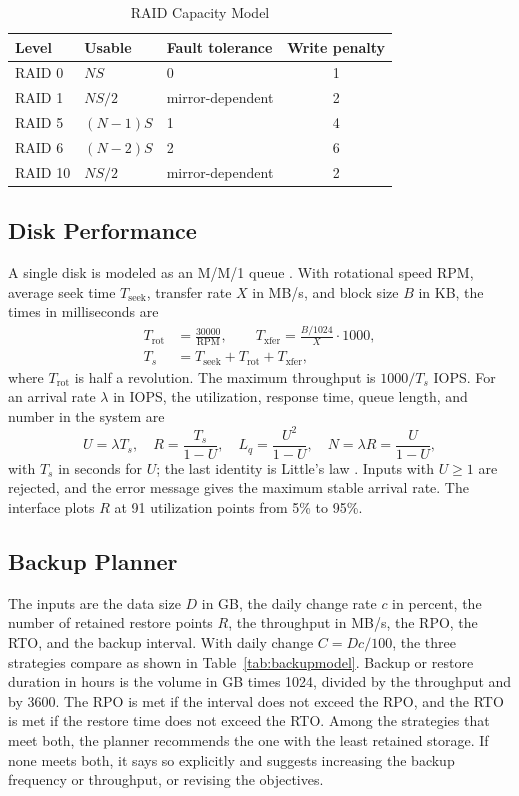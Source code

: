 \documentclass{ieeeaccess}
\begin{document}
\begin{table}[!t]
\caption{RAID Capacity Model}
\label{tab:raidcap}
\centering
\footnotesize
\begin{tabular}{lllc}
\toprule
Level & Usable & Fault tolerance & Write penalty \\
\midrule
RAID 0 & $N S$ & 0 & 1 \\
RAID 1 & $N S/2$ & mirror-dependent & 2 \\
RAID 5 & $(N-1) S$ & 1 & 4 \\
RAID 6 & $(N-2) S$ & 2 & 6 \\
RAID 10 & $N S/2$ & mirror-dependent & 2 \\
\bottomrule
\end{tabular}
\end{table}

\subsection{Disk Performance}
A single disk is modeled as an M/M/1 queue \cite{kleinrock1975queueing}. With rotational speed RPM, average seek time $T_{\text{seek}}$, transfer rate $X$ in MB/s, and block size $B$ in KB, the times in milliseconds are \begin{align} T_{\text{rot}} &= \frac{30000}{\text{RPM}}, \qquad T_{\text{xfer}} = \frac{B/1024}{X} \cdot 1000, \\ T_s &= T_{\text{seek}} + T_{\text{rot}} + T_{\text{xfer}} , \end{align} where $T_{\text{rot}}$ is half a revolution. The maximum throughput is $1000/T_s$ IOPS. For an arrival rate $\lambda$ in IOPS, the utilization, response time, queue length, and number in the system are \begin{equation} U = \lambda T_s, \quad R = \frac{T_s}{1-U}, \quad L_q = \frac{U^2}{1-U}, \quad N = \lambda R = \frac{U}{1-U}, \label{eq:mm1} \end{equation} with $T_s$ in seconds for $U$; the last identity is Little's law \cite{little1961proof}. Inputs with $U \ge 1$ are rejected, and the error message gives the maximum stable arrival rate. The interface plots $R$ at 91 utilization points from 5\% to 95\%.

\subsection{Backup Planner}
The inputs are the data size $D$ in GB, the daily change rate $c$ in percent, the number of retained restore points $R$, the throughput in MB/s, the RPO, the RTO, and the backup interval. With daily change $C = D c/100$, the three strategies compare as shown in Table~\ref{tab:backupmodel}. Backup or restore duration in hours is the volume in GB times 1024, divided by the throughput and by 3600. The RPO is met if the interval does not exceed the RPO, and the RTO is met if the restore time does not exceed the RTO. Among the strategies that meet both, the planner recommends the one with the least retained storage. If none meets both, it says so explicitly and suggests increasing the backup frequency or throughput, or revising the objectives.
\end{document}

